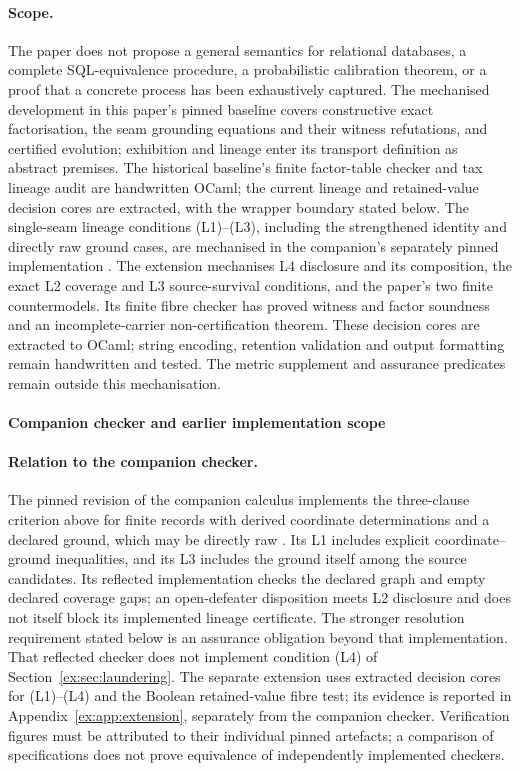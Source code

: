 \documentclass[11pt]{article}
\theoremstyle{definition}
\begin{document}
\paragraph{Scope.} The paper does not propose a general semantics for relational databases, a complete SQL-equivalence procedure, a probabilistic calibration theorem, or a proof that a concrete process has been exhaustively captured. The mechanised development in this paper's pinned baseline covers constructive exact factorisation, the seam grounding equations and their witness refutations, and certified evolution; exhibition and lineage enter its transport definition as abstract premises. The historical baseline's finite factor-table checker and tax lineage audit are handwritten OCaml; the current lineage and retained-value decision cores are extracted, with the wrapper boundary stated below. The single-seam lineage conditions (L1)--(L3), including the strengthened identity and directly raw ground cases, are mechanised in the companion's separately pinned implementation \citep{moore2026transport}. The extension mechanises L4 disclosure and its composition, the exact L2 coverage and L3 source-survival conditions, and the paper's two finite countermodels. Its finite fibre checker has proved witness and factor soundness and an incomplete-carrier non-certification theorem. These decision cores are extracted to OCaml; string encoding, retention validation and output formatting remain handwritten and tested. The metric supplement and assurance predicates remain outside this mechanisation.


\paragraph{Companion checker and earlier implementation scope}
\paragraph{Relation to the companion checker.}
The pinned revision of the companion calculus implements the three-clause criterion
above for finite records with derived coordinate determinations and
a declared ground, which may be directly raw
\citep{moore2026transport}. Its L1 includes explicit coordinate--ground
inequalities, and its L3 includes the ground itself among the source
candidates. Its reflected implementation checks the declared graph
and empty declared coverage gaps; an open-defeater disposition meets
L2 disclosure and does not itself block its implemented lineage
certificate. The stronger resolution requirement stated below is
an assurance obligation beyond that implementation.
That reflected checker does not implement condition (L4) of
Section~\ref{ex:sec:laundering}. The separate extension uses extracted decision cores for
(L1)--(L4) and the Boolean retained-value fibre test; its evidence is reported
in Appendix~\ref{ex:app:extension}, separately from the companion checker.
Verification figures must be attributed to their individual pinned
artefacts; a comparison of specifications does not prove equivalence
of independently implemented checkers.
\end{document}
